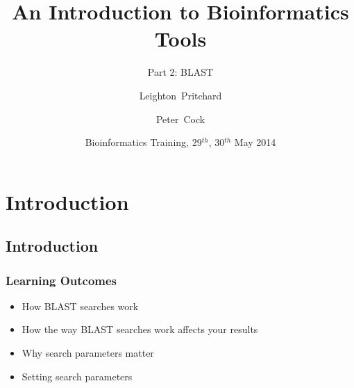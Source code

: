 
%



\title[Intro to Bioinformatics] %
{An Introduction to Bioinformatics Tools}
\subtitle{Part 2: BLAST}
\author[Pritchard, Cock] %
{Leighton~Pritchard \and Peter~Cock}
\date[May 2014] %
{Bioinformatics Training, 29$^{th}$, 30$^{th}$ May 2014}
\subject{Bioinformatics}





\frame[plain]{\titlepage}

\section{Introduction}
\subsection{Introduction}
\begin{frame}
  \frametitle{Learning Outcomes}
  \begin{itemize}
    \item How BLAST searches work
    \item How the way BLAST searches work affects your results
    \item Why search parameters matter
    \item Setting search parameters
 \end{itemize}
\end{frame}    
  
